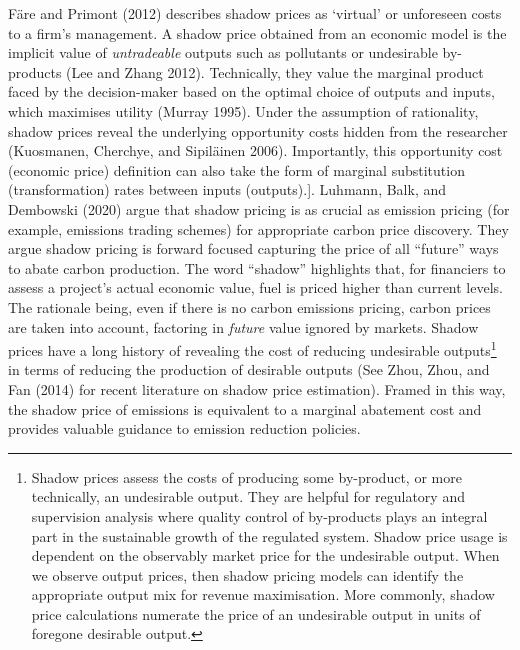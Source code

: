 \documentclass[
  10pt,
]{article}
\begin{document}
Färe and Primont (2012) describes shadow prices as `virtual' or
unforeseen costs to a firm's management. A shadow price obtained from an
economic model is the implicit value of \emph{untradeable} outputs such
as pollutants or undesirable by-products (Lee and Zhang 2012).
Technically, they value the marginal product faced by the decision-maker
based on the optimal choice of outputs and inputs, which maximises
utility (Murray 1995). Under the assumption of rationality, shadow
prices reveal the underlying opportunity costs hidden from the
researcher (Kuosmanen, Cherchye, and Sipiläinen 2006). Importantly, this
opportunity cost (economic price) definition can also take the form of
marginal substitution (transformation) rates between inputs
(outputs).{]}. Luhmann, Balk, and Dembowski (2020) argue that shadow
pricing is as crucial as emission pricing (for example, emissions
trading schemes) for appropriate carbon price discovery. They argue
shadow pricing is forward focused capturing the price of all ``future'' ways to abate carbon production. The word
``shadow'' highlights that, for financiers to assess a project's actual
economic value, fuel is priced higher than current levels. The rationale
being, even if there is no carbon emissions pricing, carbon prices are
taken into account, factoring in \emph{future} value ignored by markets.
Shadow prices have a long history of revealing the cost of reducing
undesirable outputs\footnote{Shadow prices assess the costs of producing
  some by-product, or more technically, an undesirable output. They are
  helpful for regulatory and supervision analysis where quality control
  of by-products plays an integral part in the sustainable growth of the
  regulated system. Shadow price usage is dependent on the observably market price for the undesirable output. When we observe output
  prices, then shadow pricing models can identify the appropriate output
  mix for revenue maximisation. More commonly, shadow price calculations
  numerate the price of an undesirable output in units of foregone
  desirable output.} in terms of reducing the production of desirable
outputs (See Zhou, Zhou, and Fan (2014) for recent literature on shadow
price estimation). Framed in this way, the shadow price of emissions is equivalent to a marginal abatement cost and provides
valuable guidance to emission reduction policies.
\end{document}

